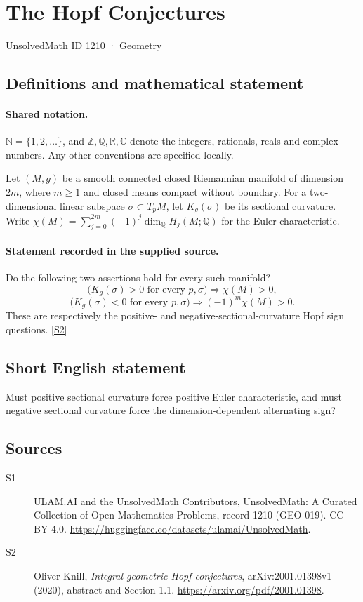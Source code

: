 \documentclass[11pt]{article}
\newcommand{\sref}[2]{\hyperlink{source:#1:#2}{[S#2]}}
\begin{document}
\setcounter{section}{1209}
\section{The Hopf Conjectures}\label{1210}
{\small\sffamily UnsolvedMath ID 1210 · Geometry}
\subsection{Definitions and mathematical statement}

\paragraph{Shared notation.}$\mathbb N=\{1,2,\ldots\}$, and $\mathbb Z,\mathbb Q,\mathbb R,\mathbb C$ denote the integers, rationals, reals and complex numbers. Any other conventions are specified locally.


Let $(M,g)$ be a smooth connected closed Riemannian manifold of dimension $2m$, where $m\geq1$ and closed means compact without boundary. For a two-dimensional linear subspace $\sigma\subset T_pM$, let $K_g(\sigma)$ be its sectional curvature. Write $\chi(M)=\sum_{j=0}^{2m}(-1)^j\dim_{\mathbb Q}H_j(M;\mathbb Q)$ for the Euler characteristic.
\paragraph{Statement recorded in the supplied source.}
Do the following two assertions hold for every such manifold?
\[
\bigl(K_g(\sigma)>0\text{ for every }p,\sigma\bigr)\Longrightarrow\chi(M)>0,
\]
\[
\bigl(K_g(\sigma)<0\text{ for every }p,\sigma\bigr)\Longrightarrow(-1)^m\chi(M)>0.
\]
These are respectively the positive- and negative-sectional-curvature Hopf sign questions. \sref{1210}{2}

\subsection{Short English statement}
Must positive sectional curvature force positive Euler characteristic, and must negative sectional curvature force the dimension-dependent alternating sign?
\subsection{Sources}
\begin{description}
\item[\hypertarget{source:1210:1}{S1}] ULAM.AI and the UnsolvedMath Contributors, UnsolvedMath: A Curated Collection of Open Mathematics Problems, record 1210 (GEO-019). CC BY 4.0. \url{https://huggingface.co/datasets/ulamai/UnsolvedMath}.
\item[\hypertarget{source:1210:2}{S2}] Oliver Knill, \emph{Integral geometric Hopf conjectures}, arXiv:2001.01398v1 (2020), abstract and Section 1.1. \url{https://arxiv.org/pdf/2001.01398}.
\end{description}
\label{end:1210}
\end{document}
